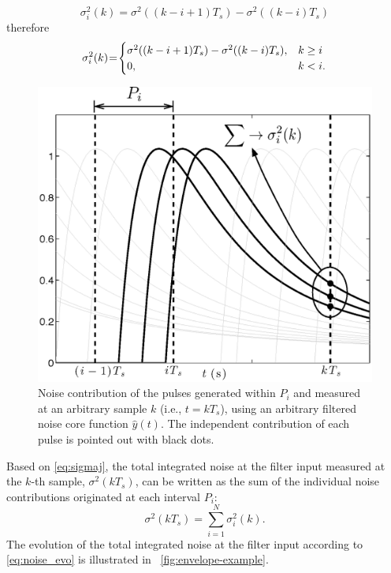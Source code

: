 \begin{equation}
		\sigma_i^2(k) = \sigma^2\left(\left(k-i+1\right)T_s\right)-\sigma^2\left(\left(k-i\right)T_s\right) 
		\label{eq:ap4}
\end{equation}
therefore
\begin{equation}
  \sigma_i^2(k) \hspace{-0.2em}=\hspace{-0.2em} 
  \begin{cases}
     \sigma^2((k-i+1)T_s)-\sigma^2((k-i)T_s ), & k \geq i   \\
      0, &   k < i.
  \end{cases}\label{eq:sigmaj}
\end{equation}

\begin{figure}[!t]
	\centering
	\includegraphics[width=4.5in]{./Figures/sequence.eps}
	\caption{Noise contribution of the pulses generated within $P_i$ and measured at an arbitrary sample $k$ (i.e., $t=kT_s$), using an arbitrary filtered noise core function $\hat{y}(t)$. The independent contribution of each pulse is pointed out with black dots.}\label{fig:sequence}
\end{figure}

Based on \eqref{eq:sigmaj}, the total integrated noise at the filter input measured at the \mbox{$k$-th} sample, $\sigma^2(kT_s)$, can be written as the sum of the individual noise contributions originated at each interval $P_i$:
\begin{equation}
\sigma^2(kT_s) = \sum_{i=1}^{N} \sigma_i^2(k). \label{eq:noise_evo}
\end{equation}
The evolution of the total integrated noise at the filter input according to \eqref{eq:noise_evo} is illustrated in \figurename~\ref{fig:envelope-example}. 


